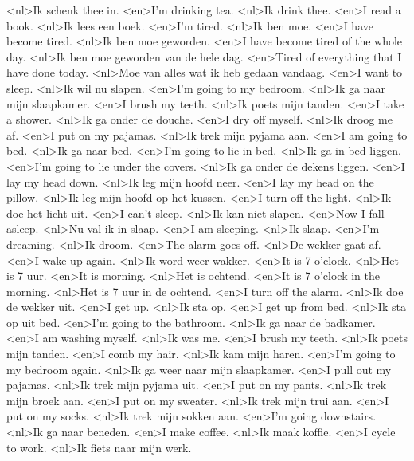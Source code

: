 <nl>Ik schenk thee in.
<en>I'm drinking tea.
<nl>Ik drink thee.
<en>I read a book.
<nl>Ik lees een boek.
<en>I'm tired.
<nl>Ik ben moe.
<en>I have become tired.
<nl>Ik ben moe geworden.
<en>I have become tired of the whole day.
<nl>Ik ben moe geworden van de hele dag.
<en>Tired of everything that I have done today.
<nl>Moe  van alles wat ik heb gedaan vandaag.
<en>I want to sleep.
<nl>Ik wil nu slapen.
<en>I'm going to my bedroom.
<nl>Ik ga naar mijn slaapkamer.
<en>I brush my teeth.
<nl>Ik poets mijn tanden.
<en>I take a shower.
<nl>Ik ga onder de douche.
<en>I dry off myself.
<nl>Ik droog me af.
<en>I put on my pajamas.
<nl>Ik trek mijn pyjama aan.
<en>I am going to bed.
<nl>Ik ga naar bed.
<en>I'm going to lie in bed.
<nl>Ik ga in bed liggen.
<en>I'm going to lie under the covers.
<nl>Ik ga onder de dekens liggen.
<en>I lay my head down.
<nl>Ik leg mijn hoofd neer.
<en>I lay my head on the pillow.
<nl>Ik leg mijn hoofd op het kussen.
<en>I turn off the light.
<nl>Ik doe het licht uit.
<en>I can't sleep.
<nl>Ik kan niet slapen.
<en>Now I fall asleep.
<nl>Nu val ik in slaap.
<en>I am sleeping.
<nl>Ik slaap.
<en>I'm dreaming.
<nl>Ik droom.
<en>The alarm goes off.
<nl>De wekker gaat af.
<en>I wake up again.
<nl>Ik word weer wakker.
<en>It is 7 o'clock.
<nl>Het is 7 uur.
<en>It is morning.
<nl>Het is ochtend.
<en>It is 7 o'clock in the morning.
<nl>Het is 7 uur in de ochtend.
<en>I turn off the alarm.
<nl>Ik doe de wekker uit.
<en>I get up.
<nl>Ik sta op.
<en>I get up from bed.
<nl>Ik sta op uit bed.
<en>I'm going to the bathroom.
<nl>Ik ga naar de badkamer.
<en>I am washing myself.
<nl>Ik was me.
<en>I brush my teeth.
<nl>Ik poets mijn tanden.
<en>I comb my hair.
<nl>Ik kam mijn haren.
<en>I'm going to my bedroom again.
<nl>Ik ga weer naar mijn slaapkamer.
<en>I pull out my pajamas.
<nl>Ik trek mijn pyjama uit.
<en>I put on my pants.
<nl>Ik trek mijn broek aan.
<en>I put on my sweater.
<nl>Ik trek mijn trui aan.
<en>I put on my socks.
<nl>Ik trek mijn sokken aan.
<en>I'm going downstairs.
<nl>Ik ga naar beneden.
<en>I make coffee.
<nl>Ik maak koffie.
<en>I cycle to work.
<nl>Ik fiets naar mijn werk.
